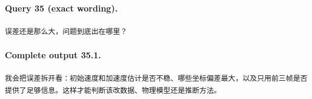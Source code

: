 \documentclass[UTF8,10pt]{ctexart}
\begin{document}
\paragraph{Query 35 (exact wording).}
\begin{Verbatim}[breaklines=true,breakanywhere=true,fontsize=\scriptsize,frame=single,framesep=2pt]
误差还是那么大，问题到底出在哪里？
\end{Verbatim}

\paragraph{Complete output 35.1.}
\begin{Verbatim}[breaklines=true,breakanywhere=true,fontsize=\scriptsize,frame=single,framesep=2pt]
我会把误差拆开看：初始速度和加速度估计是否不稳、哪些坐标偏差最大，以及只用前三帧是否提供了足够信息。这样才能判断该改数据、物理模型还是推断方法。
\end{Verbatim}
\end{document}
